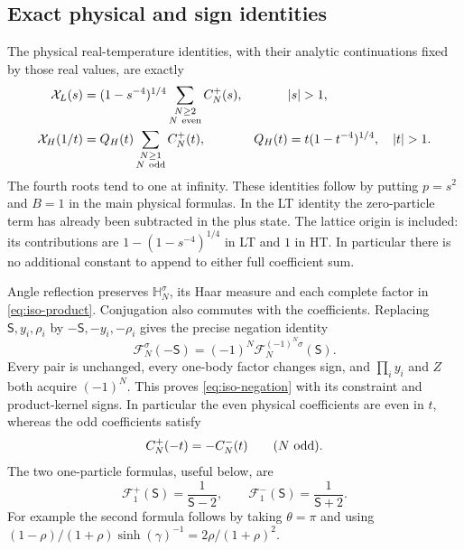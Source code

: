 \documentclass[11pt]{article}
\numberwithin{equation}{section}
\theoremstyle{definition}
\begin{document}
\subsection{Exact physical and sign identities}

The physical real-temperature identities, with their analytic
continuations fixed by those real values, are exactly
\begin{align}
 \mathcal X_L(s)
   &=(1-s^{-4})^{1/4}
       \sum_{\substack{N\ge2\\N\ {\rm even}}}C_N^+(s),
       &&|s|>1,\label{eq:iso-physical-L}\\
 \mathcal X_H(1/t)
   &=Q_H(t)\sum_{\substack{N\ge1\\N\ {\rm odd}}}C_N^+(t),
       &Q_H(t)&=t(1-t^{-4})^{1/4},\quad |t|>1.
       \label{eq:iso-physical-H}
\end{align}
The fourth roots tend to one at infinity.  These identities follow by
putting $p=s^2$ and $B=1$ in the main physical formulas.  In the LT
identity the zero-particle term has already been subtracted in the plus
state.  The lattice origin is included: its contributions are
$1-(1-s^{-4})^{1/4}$ in LT and $1$ in HT.  In particular there is no
additional constant to append to either full coefficient sum.

Angle reflection preserves $\mathbb H_N^\sigma$, its Haar measure and
each complete factor in \eqref{eq:iso-product}.  Conjugation also
commutes with the coefficients.  Replacing $\mathsf S,y_i,\rho_i$ by
$-\mathsf S,-y_i,-\rho_i$ gives the precise negation identity
\begin{equation}\label{eq:iso-negation}
 \mathcal F_N^\sigma(-\mathsf S)
   =(-1)^N\mathcal F_N^{(-1)^N\sigma}(\mathsf S).
\end{equation}
Every pair is unchanged, every one-body factor changes sign, and
$\prod_i y_i$ and $Z$ both acquire $(-1)^N$.  This proves
\eqref{eq:iso-negation} with its constraint and product-kernel signs.
In particular the even physical coefficients are even in $t$, whereas
the odd coefficients satisfy
\begin{equation}\label{eq:iso-odd-negation}
 C_N^+(-t)=-C_N^-(t)\qquad(N\ {\rm odd}).
\end{equation}
The two one-particle formulas, useful below, are
\begin{equation}\label{eq:iso-one-particle}
 \mathcal F_1^+(\mathsf S)=\frac1{\mathsf S-2},\qquad
 \mathcal F_1^-(\mathsf S)=\frac1{\mathsf S+2}.
\end{equation}
For example the second formula follows by taking $\theta=\pi$ and
using $(1-\rho)/(1+\rho)\sinh(\gamma)^{-1}
=2\rho/(1+\rho)^2$.
\end{document}
